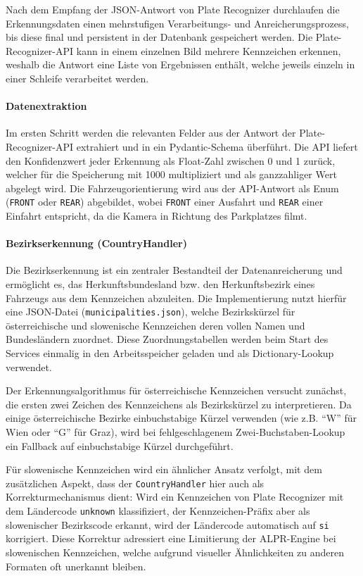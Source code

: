 Nach dem Empfang der JSON-Antwort von Plate Recognizer durchlaufen die Erkennungsdaten einen mehrstufigen Verarbeitungs- und Anreicherungsprozess, bis diese final und persistent in der Datenbank gespeichert werden.
Die Plate-Recognizer-API kann in einem einzelnen Bild mehrere Kennzeichen erkennen, weshalb die Antwort eine Liste von Ergebnissen enthält, welche jeweils einzeln in einer Schleife verarbeitet werden.

\paragraph{Datenextraktion}
Im ersten Schritt werden die relevanten Felder aus der Antwort der Plate-Recognizer-API extrahiert und in ein Pydantic-Schema überführt.
Die API liefert den Konfidenzwert jeder Erkennung als Float-Zahl zwischen 0 und 1 zurück, welcher für die Speicherung mit 1000 multipliziert und als ganzzahliger Wert abgelegt wird.
Die Fahrzeugorientierung wird aus der API-Antwort als Enum (\texttt{FRONT} oder \texttt{REAR}) abgebildet, wobei \texttt{FRONT} einer Ausfahrt und \texttt{REAR} einer Einfahrt entspricht, da die Kamera in Richtung des Parkplatzes filmt.

\paragraph{Bezirkserkennung (CountryHandler)}
Die Bezirkserkennung ist ein zentraler Bestandteil der Datenanreicherung und ermöglicht es, das Herkunftsbundesland bzw. den Herkunftsbezirk eines Fahrzeugs aus dem Kennzeichen abzuleiten.
Die Implementierung nutzt hierfür eine JSON-Datei (\texttt{municipalities.json}), welche Bezirkskürzel für österreichische \cite{oesterreich_kfz} und slowenische \cite{wiki_slovenia_plates} Kennzeichen deren vollen Namen und Bundesländern zuordnet.
Diese Zuordnungstabellen werden beim Start des Services einmalig in den Arbeitsspeicher geladen und als Dictionary-Lookup verwendet.

Der Erkennungsalgorithmus für österreichische Kennzeichen versucht zunächst, die ersten zwei Zeichen des Kennzeichens als Bezirkskürzel zu interpretieren.
Da einige österreichische Bezirke einbuchstabige Kürzel verwenden (wie z.B. "`W"' für Wien oder "`G"' für Graz), wird bei fehlgeschlagenem Zwei-Buchstaben-Lookup ein Fallback auf einbuchstabige Kürzel durchgeführt.

Für slowenische Kennzeichen wird ein ähnlicher Ansatz verfolgt, mit dem zusätzlichen Aspekt, dass der \texttt{CountryHandler} hier auch als Korrekturmechanismus dient:
Wird ein Kennzeichen von Plate Recognizer mit dem Ländercode \texttt{unknown} klassifiziert, der Kennzeichen-Präfix aber als slowenischer Bezirkscode erkannt, wird der Ländercode automatisch auf \texttt{si} korrigiert.
Diese Korrektur adressiert eine Limitierung der ALPR-Engine bei slowenischen Kennzeichen, welche aufgrund visueller Ähnlichkeiten zu anderen Formaten oft unerkannt bleiben.

